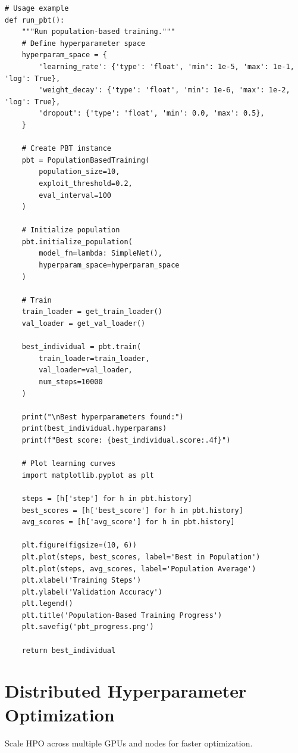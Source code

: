 \begin{lstlisting}[style=python, caption=Population-based training implementation]
# Usage example
def run_pbt():
    """Run population-based training."""
    # Define hyperparameter space
    hyperparam_space = {
        'learning_rate': {'type': 'float', 'min': 1e-5, 'max': 1e-1, 'log': True},
        'weight_decay': {'type': 'float', 'min': 1e-6, 'max': 1e-2, 'log': True},
        'dropout': {'type': 'float', 'min': 0.0, 'max': 0.5},
    }

    # Create PBT instance
    pbt = PopulationBasedTraining(
        population_size=10,
        exploit_threshold=0.2,
        eval_interval=100
    )

    # Initialize population
    pbt.initialize_population(
        model_fn=lambda: SimpleNet(),
        hyperparam_space=hyperparam_space
    )

    # Train
    train_loader = get_train_loader()
    val_loader = get_val_loader()

    best_individual = pbt.train(
        train_loader=train_loader,
        val_loader=val_loader,
        num_steps=10000
    )

    print("\nBest hyperparameters found:")
    print(best_individual.hyperparams)
    print(f"Best score: {best_individual.score:.4f}")

    # Plot learning curves
    import matplotlib.pyplot as plt

    steps = [h['step'] for h in pbt.history]
    best_scores = [h['best_score'] for h in pbt.history]
    avg_scores = [h['avg_score'] for h in pbt.history]

    plt.figure(figsize=(10, 6))
    plt.plot(steps, best_scores, label='Best in Population')
    plt.plot(steps, avg_scores, label='Population Average')
    plt.xlabel('Training Steps')
    plt.ylabel('Validation Accuracy')
    plt.legend()
    plt.title('Population-Based Training Progress')
    plt.savefig('pbt_progress.png')

    return best_individual
\end{lstlisting}

\section{Distributed Hyperparameter Optimization}

Scale HPO across multiple GPUs and nodes for faster optimization.

